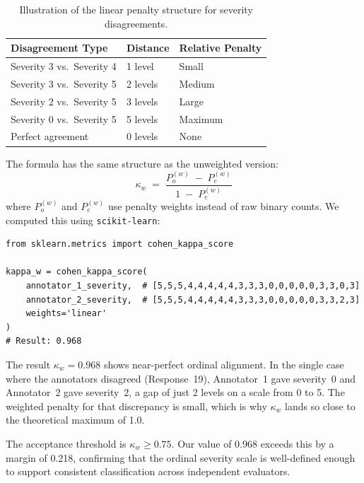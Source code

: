 \documentclass[12pt, a4paper]{article}
\begin{document}
\begin{table}[H]
\centering
\caption{Illustration of the linear penalty structure for severity disagreements.}
\label{tab:penalty}
\footnotesize
{}
\begin{tabular}{L{5cm} C{2.5cm} C{3cm}}
\toprule
{}
\color{white}\textbf{Disagreement Type} &
\color{white}\textbf{Distance} &
\color{white}\textbf{Relative Penalty} \\
\midrule
Severity 3 vs.\ Severity 4 & 1 level & Small \\
Severity 3 vs.\ Severity 5 & 2 levels & Medium \\
Severity 2 vs.\ Severity 5 & 3 levels & Large \\
Severity 0 vs.\ Severity 5 & 5 levels & Maximum \\
Perfect agreement           & 0 levels & None \\
\bottomrule
\end{tabular}
\end{table}

\noindent The formula has the same structure as the unweighted version:
$$\kappa_w \;=\; \frac{P_o^{(w)} \;-\; P_e^{(w)}}{1 \;-\; P_e^{(w)}}$$
where $P_o^{(w)}$ and $P_e^{(w)}$ use penalty weights instead of raw binary counts. We computed this using \texttt{scikit-learn}:

\begin{lstlisting}[caption={Weighted Kappa computation.}]
from sklearn.metrics import cohen_kappa_score

kappa_w = cohen_kappa_score(
    annotator_1_severity,  # [5,5,5,4,4,4,4,4,3,3,3,0,0,0,0,0,3,3,0,3]
    annotator_2_severity,  # [5,5,5,4,4,4,4,4,3,3,3,0,0,0,0,0,3,3,2,3]
    weights='linear'
)
# Result: 0.968
\end{lstlisting}

\noindent The result $\kappa_w = 0.968$ shows near-perfect ordinal alignment. In the single case where the annotators disagreed (Response~19), Annotator~1 gave severity~0 and Annotator~2 gave severity~2, a gap of just 2 levels on a scale from 0 to 5. The weighted penalty for that discrepancy is small, which is why $\kappa_w$ lands so close to the theoretical maximum of 1.0.

The acceptance threshold is $\kappa_w \geq 0.75$. Our value of 0.968 exceeds this by a margin of 0.218, confirming that the ordinal severity scale is well-defined enough to support consistent classification across independent evaluators.
\end{document}
